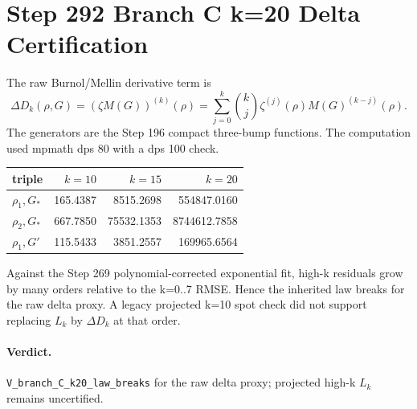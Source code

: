 \documentclass{article}
\begin{document}
\section*{Step 292 Branch C k=20 Delta Certification}
The raw Burnol/Mellin derivative term is
\[
  \Delta D_k(\rho,G)=(\zeta M(G))^{(k)}(\rho)
  =\sum_{j=0}^k {k\choose j}\zeta^{(j)}(\rho)M(G)^{(k-j)}(\rho).
\]
The generators are the Step 196 compact three-bump functions. The computation used mpmath dps 80 with a dps 100 check.

\begin{center}\begin{tabular}{lrrr}\toprule
triple & $k=10$ & $k=15$ & $k=20$\\\midrule
$\rho_1,G_*$ & 165.4387 & 8515.2698 & 554847.0160\\
$\rho_2,G_*$ & 667.7850 & 75532.1353 & 8744612.7858\\
$\rho_1,G'$ & 115.5433 & 3851.2557 & 169965.6564\\
\bottomrule\end{tabular}\end{center}

Against the Step 269 polynomial-corrected exponential fit, high-k residuals grow by many orders relative to the k=0..7 RMSE. Hence the inherited law breaks for the raw delta proxy. A legacy projected k=10 spot check did not support replacing $L_k$ by $\Delta D_k$ at that order.

\paragraph{Verdict.} \texttt{V\_branch\_C\_k20\_law\_breaks} for the raw delta proxy; projected high-k $L_k$ remains uncertified.
\end{document}
